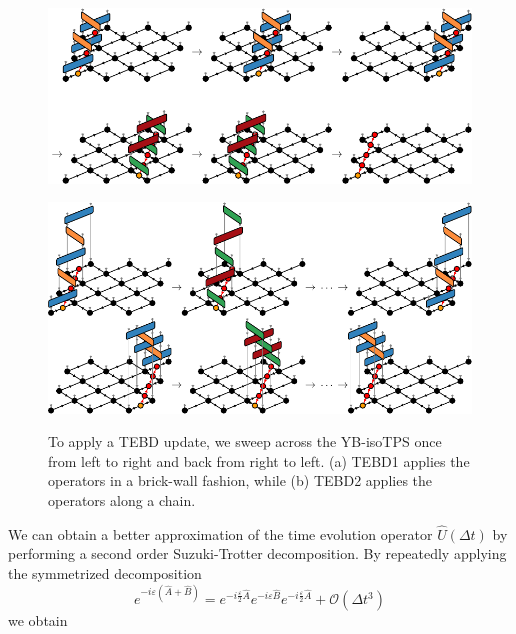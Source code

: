 \begin{figure}
	\centering
	\subcaptionbox{\label{fig:YB_isoTPS_TEBD_global_update_applying_TEBD1}}
	{%
		\includegraphics[scale=1]{figures/tikz/YB_isoTPS/tebd_global_update_steps/tebd_global_update_steps_a.pdf}
	}
	\par\bigskip\medskip
	\subcaptionbox{\label{fig:YB_isoTPS_TEBD_global_update_applying_TEBD2}}
	{%
		\includegraphics[scale=1]{figures/tikz/YB_isoTPS/tebd_global_update_steps/tebd_global_update_steps_b.pdf}
	}
	\caption{To apply a TEBD update, we sweep across the YB-isoTPS once from left to right and back from right to left. (a) TEBD1 applies the operators in a brick-wall fashion, while (b) TEBD2 applies the operators along a chain.}
	\label{fig:YB_isoTPS_TEBD_global_update_applying_TEBD}
\end{figure}
We can obtain a better approximation of the time evolution operator $\hat{U}(\Delta t)$ by performing a second order Suzuki-Trotter decomposition. By repeatedly applying the symmetrized decomposition
\begin{equation}
	e^{-i\varepsilon(\hat{A}+\hat{B})} = e^{-i\frac{\varepsilon}{2}\hat{A}}e^{-i\varepsilon \hat{B}}e^{-i\frac{\varepsilon}{2}\hat{A}} + \mathcal{O}(\Delta t^3)
\end{equation}
we obtain
